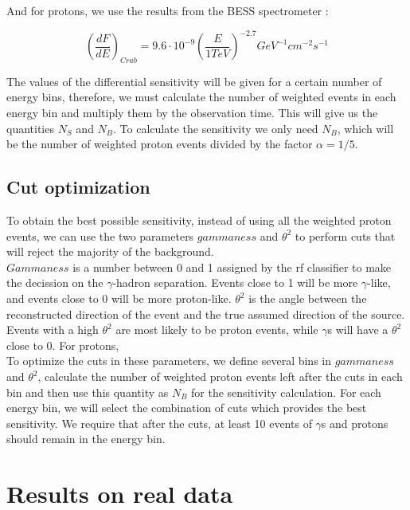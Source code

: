 \documentclass[main.tex]{subfiles}
\begin{document}
And for protons, we use the results from the BESS spectrometer \cite{2000protonBESS}:

\begin{equation}
    \left(\frac{dF}{dE}\right)_{Crab} = 9.6\cdot 10^{-9} \left(\frac{E}{1 TeV}\right)^{-2.7} GeV^{-1}cm^{-2}s^{-1}
\end{equation}

The values of the differential sensitivity will be given for a certain number of energy bins, therefore, we must calculate the number of weighted events in each energy bin and multiply them by the observation time. This will give us the quantities $N_{S}$ and $N_{B}$. To calculate the sensitivity we only need $N_{B}$, which will be the number of weighted proton events divided by the factor $\alpha = 1/5$.

\subsection{Cut optimization}

To obtain the best possible sensitivity, instead of using all the weighted proton events, we can use the two parameters $gammaness$ and $\theta^2$ to perform cuts that will reject the majority of the background.\\
$Gammaness$ is a number between 0 and 1 assigned by the \gls{rf} classifier to make the decission on the $\gamma$-hadron separation. Events close to 1 will be more $\gamma$-like, and events close to 0 will be more proton-like.
$\theta^2$ is the angle between the reconstructed direction of the event and the true assumed direction of the source. Events with a high $\theta^2$ are most likely to be proton events, while $\gamma$s will have a $\theta^2$ close to 0. For protons, 
\\
To optimize the cuts in these parameters, we define several bins in $gammaness$ and $\theta^2$, calculate the number of weighted proton events left after the cuts in each bin and then use this quantity as $N_{B}$ for the sensitivity calculation. For each energy bin, we will select the combination of cuts which provides the best sensitivity. We require that after the cuts, at least 10 events of $\gamma$s and protons should remain in the energy bin.  

\section{Results on real data}
\end{document}
